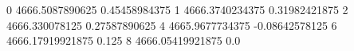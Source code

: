 0 4666.5087890625 0.45458984375
1 4666.3740234375 0.31982421875
2 4666.330078125 0.27587890625
4 4665.9677734375 -0.08642578125
6 4666.17919921875 0.125
8 4666.05419921875 0.0
